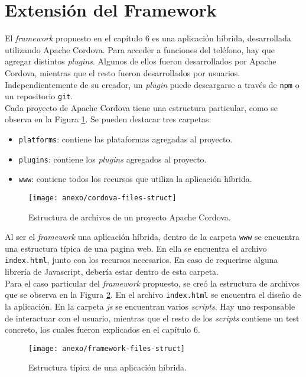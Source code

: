 \section*{Extensión del Framework}
El \emph{framework} propuesto en el capítulo 6 es una aplicación híbrida, desarrollada utilizando Apache Cordova. Para acceder a funciones del teléfono, hay que agregar distintos \emph{plugins}. Algunos de ellos fueron desarrollados por Apache Cordova, mientras que el resto fueron desarrollados por usuarios. Independientemente de su creador, un \emph{plugin} puede descargarse a través de \texttt{npm} o un repositorio \texttt{git}.\\

Cada proyecto de Apache Cordova tiene una estructura particular, como se observa en la Figura \ref{fig:anexo:cordova-files-struct}. Se pueden destacar tres carpetas:
\begin{itemize}
\item \texttt{platforms}: contiene las plataformas agregadas al proyecto.
\item \texttt{plugins}: contiene los \emph{plugins} agregados al proyecto.
\item \texttt{www}: contiene todos los recursos que utiliza la aplicación híbrida.
\end{itemize}
\begin{figure}[htbp]
    \centering
	\texttt{[image: anexo/cordova-files-struct]}
	\caption{Estructura de archivos de un proyecto Apache Cordova.}
    \label{fig:anexo:cordova-files-struct}
\end{figure}
Al ser el \emph{framework} una aplicación híbrida, dentro de la carpeta \texttt{www} se encuentra una estructura típica de una pagina web. En ella se encuentra el archivo \texttt{index.html}, junto con los recursos necesarios. En caso de requerirse alguna librería de Javascript, debería estar dentro de esta carpeta.\\

Para el caso particular del \emph{framework} propuesto, se creó la estructura de archivos que se observa en la Figura \ref{fig:anexo:framework-files-struct}. En el archivo \texttt{index.html} se encuentra el diseño de la aplicación. En la carpeta \emph{js} se encuentran varios \emph{scripts}. Hay uno responsable de interactuar con el usuario, mientras que el resto de los \emph{scripts} contiene un test concreto, los cuales fueron explicados en el capítulo 6.\\
\begin{figure}[htbp]
    \centering
	\texttt{[image: anexo/framework-files-struct]}
	\caption{Estructura típica de una aplicación híbrida.}
    \label{fig:anexo:framework-files-struct}
\end{figure}

